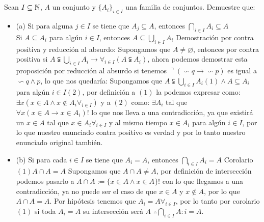 \section{}
Sean $I \subseteq \mathbb{N}$, $A$ un conjunto y $\{ A_i \}_{i \in I}$ una familia de conjuntos. Demuestre que:
\begin{itemize}
	\item (a) Si para alguna $j \in I$ se tiene que $A_j \subseteq A$, entonces $\bigcap_{i \in I} A_i \subseteq A$ \newline\\
	
	Si $A \subseteq A_i$ para algún $i \in I$, entonces $A \subseteq \bigcup_{i \in I} A_i$\newline
	Demostración por contra positiva y reducción al absurdo:	\newline
	Supongamos que $A \neq \varnothing$, entonces por contra positiva si  $A \subsetneqq  \bigcup_{i \in I} A_i \rightarrow \forall_{i \in I} (A \subsetneqq A_i)$, ahora podemos demostrar esta proposición por reducción al absurdo si tenemos $\urcorner(\backsim q \rightarrow \backsim p )$ es igual a $\backsim q \wedge p$, lo que nos quedaría:\newline
	Supongamos que $A \subsetneqq \bigcup_{i \in I}A_i  (1)  \wedge A \subseteq A_i$ para algún  $i \in I (2)$, por definición a  $(1)$ la podemos expresar como: \newline
	$\exists x (x \in A \wedge x \notin A_i \forall_{i \in I})$ y a $(2)$ como: \newline
	$\exists A_i$ tal que $\forall x (x \in A \rightarrow x \in A_i)!$ lo que nos lleva a una contradicción, ya que existirá un $x \in A$ tal que $x \in A_i \forall_{i \in I}$ y al mismo tiempo $x \in A_i$ para algún $i \in I$, por lo que nuestro enunciado contra positivo es verdad y por lo tanto nuestro enunciado original también.
	
	
 	\item (b) Si para cada $i \in I$ se tiene que $A_i = A$, entonces  $\bigcap_{i \in I} A_i = A$\newline
 	Corolario $(1) A \cap A = A$\newline
 	Supongamos que $A \cap A \neq A$, por definición de intersección podemos pasarlo a $A \cap A := \{  x \in A \wedge x \in A \}!$ con lo que llegamos a una contradicción, ya no puede ser el caso de que $x \in A$ y $x \notin A$, por lo que $A \cap A = A$.\newline
 	Por hipótesis tenemos que $A_i =A \forall_{i \in I}$, por lo tanto por corolario $(1)$ si toda $A_i = A$ su intersección será $A$\newline
 	$\therefore \bigcap_{i \in I}A:i = A$.
 	

\end{itemize}
